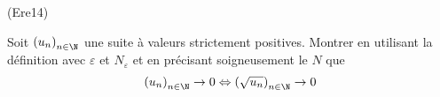 \begin{tiny}(Ere14)\end{tiny} Soit $\left( u_n\right) _{n\in \N}$ une suite à valeurs strictement positives. Montrer en utilisant la définition avec $\varepsilon$ et $N_\varepsilon$ et en précisant soigneusement le $N$ que
\begin{displaymath}
 \left( u_n\right) _{n\in \N} \rightarrow 0 \Leftrightarrow \left( \sqrt{u_n}\right) _{n\in \N} \rightarrow 0 
\end{displaymath}
  
